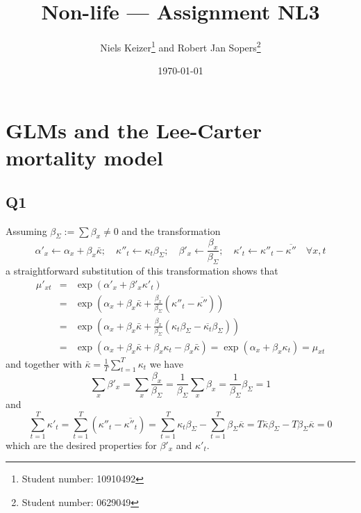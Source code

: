 \documentclass[11pt]{article}
\title{Non-life --- Assignment NL3}  %
\author{
  Niels Keizer\footnote{Student number: 10910492}
  \quad and \quad
  Robert Jan Sopers\footnote{Student number: 0629049}
}
\date{\today}
\begin{document}
\maketitle

\section{GLMs and the Lee-Carter mortality model}

\subsection*{Q1}

Assuming $\beta_\Sigma := \sum \beta_x \not = 0$ and the transformation
\begin{equation}
\alpha'_x  \leftarrow \alpha_x  + \beta_x \bar{\kappa}; \quad \kappa''_t \leftarrow \kappa_t \beta_\Sigma; \quad \beta'_x \leftarrow \frac{\beta_x}{\beta_\Sigma}; \quad \kappa'_t \leftarrow \kappa''_t  - \overline{\kappa''} \quad \forall x,t
\end{equation}
a straightforward substitution of this transformation shows that 
\begin{eqnarray*}
\mu'_{xt} &=& \exp(\alpha'_x + \beta'_x \kappa'_t) \\
		  &=& \exp \left ( \alpha_x + \beta_x \bar{\kappa} + \frac{\beta_x}{\beta_\Sigma} ( \kappa''_t - \overline{\kappa''}) \right ) \\
		  &=& \exp \left (  \alpha_x + \beta_x \bar{\kappa} + \frac{\beta_x}{\beta_\Sigma} ( \kappa_t \beta_\Sigma - \overline{\kappa_t} \beta_\Sigma) \right ) \\
		  &=& \exp \left ( \alpha_x + \beta_x \bar{\kappa} + \beta_x \kappa_t - \beta_x  \bar{\kappa}\right ) = \exp(\alpha_x + \beta_x \kappa_t)  = \mu_{xt}
\end{eqnarray*}
and together with $\bar{\kappa} = \frac{1}{T} \sum_{t=1}^T \kappa_t$ we have
\begin{equation}
\sum_x \beta'_x = \sum_x \frac{\beta_x}{\beta_\Sigma} = \frac{1}{\beta_\Sigma} \sum_x \beta_x = \frac{1}{\beta_\Sigma} \beta_\Sigma = 1
\end{equation}
and 
\begin{equation}
\sum_{t=1}^T \kappa'_t = \sum_{t=1}^T (\kappa''_t - \overline{\kappa''_t}) = \sum_{t=1}^T \kappa_t \beta_\Sigma - \sum_{t=1}^T \beta_\Sigma \overline{\kappa} = T \overline{\kappa} \beta_\Sigma - T \beta_\Sigma \overline{\kappa} =0 
\end{equation}
which are the desired properties for $\beta'_x$ and $\kappa'_t$.
\end{document}
